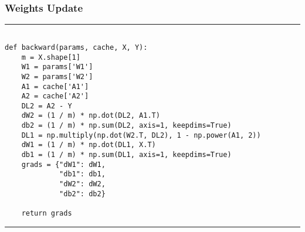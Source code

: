 \documentclass[11pt]{beamer}
\begin{document}
\begin{frame}[fragile]
\frametitle{Weights Update}
\rule{\textwidth}{1pt}
\scriptsize
\begin{verbatim}

def backward(params, cache, X, Y):
    m = X.shape[1]
    W1 = params['W1']
    W2 = params['W2']
    A1 = cache['A1']
    A2 = cache['A2']
    DL2 = A2 - Y
    dW2 = (1 / m) * np.dot(DL2, A1.T)
    db2 = (1 / m) * np.sum(DL2, axis=1, keepdims=True)
    DL1 = np.multiply(np.dot(W2.T, DL2), 1 - np.power(A1, 2))
    dW1 = (1 / m) * np.dot(DL1, X.T)
    db1 = (1 / m) * np.sum(DL1, axis=1, keepdims=True)
    grads = {"dW1": dW1,
             "db1": db1,
             "dW2": dW2,
             "db2": db2}

    return grads
\end{verbatim}
\rule{\textwidth}{1pt}
\end{frame}
\end{document}
